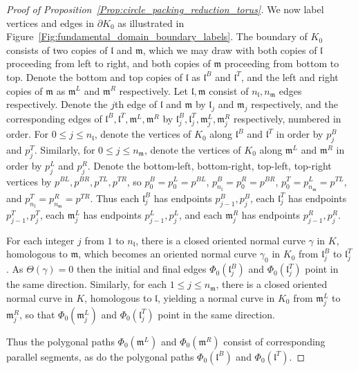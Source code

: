 \documentclass[12pt]{amsart}
\numberwithin{equation}{section}
\theoremstyle{named}
\newcommand{\reffig}[1]{Figure~\ref{Fig:#1}}
\newcommand{\refprop}[1]{Proposition~\ref{Prop:#1}}
\begin{document}
\begin{proof}[Proof of \refprop{circle_packing_reduction_torus}]
We now label vertices and edges in $\partial K_0$ as illustrated in \reffig{fundamental_domain_boundary_labels}. The boundary of $K_0$ consists of two copies of $\mathfrak{l}$ and $\mathfrak{m}$, which we may draw with both copies of $\mathfrak{l}$ proceeding from left to right, and both copies of $\mathfrak{m}$ proceeding from bottom to top. Denote the bottom and top copies of $\mathfrak{l}$ as $\mathfrak{l}^B$ and $\mathfrak{l}^T$, and the left and right copies of $\mathfrak{m}$ as $\mathfrak{m}^L$ and $\mathfrak{m}^R$ respectively. Let $\mathfrak{l}, \mathfrak{m}$ consist of $n_{\mathfrak{l}}, n_{\mathfrak{m}}$ edges respectively. Denote the $j$th edge of $\mathfrak{l}$ and $\mathfrak{m}$ by $\mathfrak{l}_j$ and $\mathfrak{m}_j$ respectively, and the corresponding edges of $\mathfrak{l}^B, \mathfrak{l}^T, \mathfrak{m}^L, \mathfrak{m}^R$ by $\mathfrak{l}_j^B, \mathfrak{l}_j^T, \mathfrak{m}_j^L, \mathfrak{m}_j^R$ respectively, numbered in order. For $0 \leq j \leq n_\mathfrak{l}$, denote the vertices of $K_0$ along $\mathfrak{l}^B$ and $\mathfrak{l}^T$ in order by $p_j^B$ and $p_j^T$. Similarly, for $0 \leq j \leq n_\mathfrak{m}$, denote the vertices of $K_0$ along $\mathfrak{m}^L$ and $\mathfrak{m}^R$ in order by $p_j^L$ and $p_j^R$. Denote the bottom-left, bottom-right, top-left, top-right vertices by $p^{BL}, p^{BR}, p^{TL}, p^{TR}$, so $p_0^B = p_0^L = p^{BL}$, $p_{n_\mathfrak{l}}^B = p_0^R = p^{BR}$, $p_0^T = p_{n_\mathfrak{m}}^L = p^{TL}$, and $p_{n_\mathfrak{l}}^T = p_{n_{\mathfrak{m}}}^R = p^{TR}$. Thus each $\mathfrak{l}_j^B$ has endpoints $p_{j-1}^B, p_j^B$, each $\mathfrak{l}_j^T$ has endpoints $p_{j-1}^T, p_j^T$, each $\mathfrak{m}_j^L$ has endpoints $p_{j-1}^L, p_j^L$, and each $\mathfrak{m}_j^R$ has endpoints $p_{j-1}^R, p_j^R$.

For each integer $j$ from $1$ to $n_\mathfrak{l}$, there is a closed oriented normal curve $\gamma$ in $K$, homologous to $\mathfrak{m}$, which becomes an oriented normal curve $\gamma_0$ in $K_0$ from $\mathfrak{l}_j^B$ to $\mathfrak{l}_j^T$. As $\Theta(\gamma) = 0$ then the initial and final edges $\Phi_0 (\mathfrak{l}_j^B)$ and $\Phi_0 (\mathfrak{l}_j^T)$ point in the same direction. Similarly, for each $1 \leq j \leq n_\mathfrak{m}$, there is a closed oriented normal curve in $K$, homologous to $\mathfrak{l}$, yielding a normal curve in $K_0$ from $\mathfrak{m}_j^L$ to $\mathfrak{m}_j^R$, so that $\Phi_0(\mathfrak{m}_j^L)$ and $\Phi_0 (\mathfrak{l}_j^T)$ point in the same direction.

Thus the polygonal paths $\Phi_0(\mathfrak{m}^L)$ and $\Phi_0(\mathfrak{m}^R)$ consist of corresponding parallel segments, as do the polygonal paths $\Phi_0(\mathfrak{l}^B)$ and $\Phi_0(\mathfrak{l}^T)$.


\end{proof}
\end{document}
